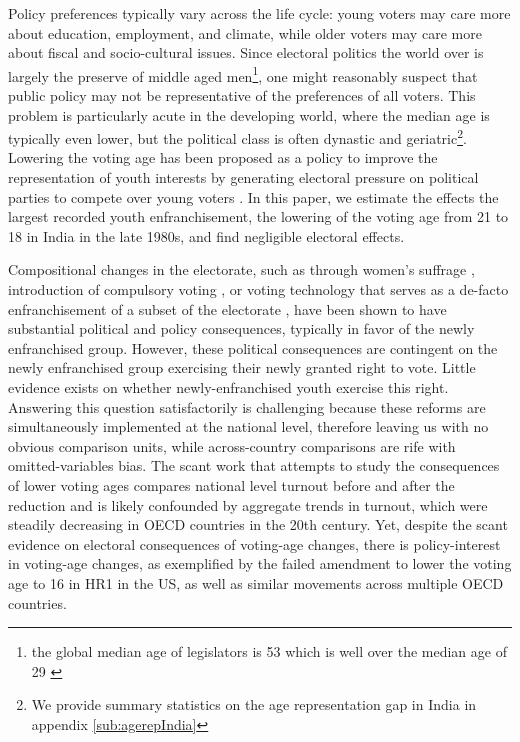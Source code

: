  \label{intro}

Policy preferences typically vary across the life cycle: young voters
may care more about education, employment, and climate, while older
voters may care more about fiscal and socio-cultural issues. Since
electoral politics the world over is largely the preserve of middle
aged men\footnote{the global median age of legislators is 53 which is
well over the median age of 29
\parencite{union2012global,united2015world}}, one might reasonably
suspect that public policy may not be representative of the
preferences of all voters. This problem is particularly acute in the
developing world, where the median age is typically even lower, but
the political class is often dynastic and geriatric\footnote{We
provide summary statistics on the age representation gap in India in
appendix \ref{sub:agerepIndia}}. Lowering the voting age has been
proposed as a policy to improve the representation of youth interests
by generating electoral pressure on political parties to compete over
young voters \parencite{vote16WP}. In this paper, we estimate the
effects the largest recorded youth enfranchisement, the lowering of
the voting age from 21 to 18 in India in the late 1980s, and find
negligible electoral effects.

Compositional changes in the electorate, such as through women's
suffrage \parencite{Miller2008-xn,Teele2018-vz,Morgan-Collins2021-yq},
introduction of compulsory voting \parencite{fowler2013electoral}, or
voting technology that serves as a de-facto enfranchisement of a
subset of the electorate
\parencite{hidalgo2012renovating,fujiwaraVotingTechnologyPolitical2015,desai2019technology},
have been shown to have substantial political and policy consequences,
typically in favor of the newly enfranchised group. However, these
political consequences are contingent on the newly enfranchised group
exercising their newly granted right to vote. Little evidence exists
on whether newly-enfranchised youth exercise this right. Answering
this question satisfactorily is challenging because these reforms are
simultaneously implemented at the national level, therefore leaving us
with no obvious comparison units, while across-country comparisons are
rife with omitted-variables bias. The scant work that attempts to
study the consequences of lower voting ages compares national level
turnout before and after the reduction
\parencite{mcallister2014politics} and is likely confounded by
aggregate trends in turnout, which were steadily decreasing in OECD
countries in the 20th century. Yet, despite the scant evidence on
electoral consequences of voting-age changes, there is policy-interest
in voting-age changes, as exemplified by the failed amendment to lower
the voting age to 16 in HR1 \parencite{vote16USAHR1} in the US, as
well as similar movements across multiple OECD countries.

